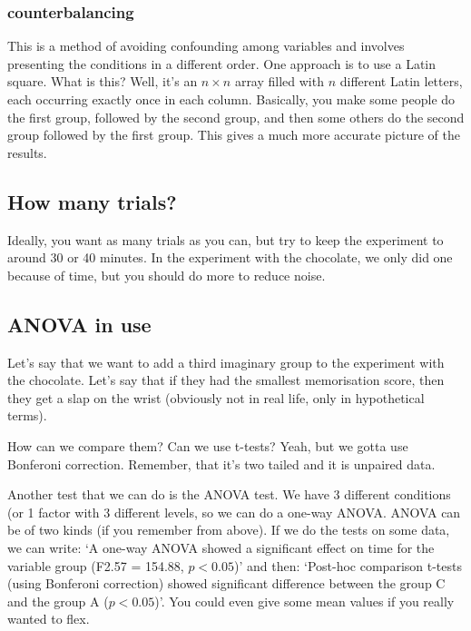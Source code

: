 \documentclass[11pt,a4paper,titlepage]{scrartcl}
\begin{document}
\subsubsection{counterbalancing}%
\label{ssub:counterbalancing}
This is a method of avoiding confounding among variables and involves
presenting the conditions in a different order. One approach is to use a
Latin square. What is this? Well, it's an $n \times n$ array filled with
$n$ different Latin letters, each occurring exactly once in each column.
Basically, you make some people do the first group, followed by the second
group, and then some others do the second group followed by the first
group. This gives a much more accurate picture of the results.

\subsection{How many trials?}%
\label{sub:trials}
Ideally, you want as many trials as you can, but try to keep the
experiment to around 30 or 40 minutes. In the experiment with the
chocolate, we only did one because of time, but you should do more to
reduce noise. 

\subsection{ANOVA in use}%
\label{sec:anova-usage}

Let's say that we want to add a third imaginary group to the experiment
with the chocolate. Let's say that if they had the smallest memorisation
score, then they get a slap on the wrist (obviously not in real life, only
in hypothetical terms). 

How can we compare them? Can we use t-tests? Yeah, but we gotta use
Bonferoni correction. Remember, that it's two tailed and it is unpaired
data.

Another test that we can do is the ANOVA test. We have 3 different
conditions (or 1 factor with 3 different levels, so we can do a one-way
ANOVA. ANOVA can be of two kinds (if you remember from above). If we do
the tests on some data, we can write: `A one-way ANOVA showed a
significant effect on time for the variable group (F2.57 = 154.88, $p <
0.05$)' and then: `Post-hoc comparison t-tests (using Bonferoni correction)
showed significant difference between the group C and the group A
($p<0.05$)'. You could even give some mean values if you really wanted to
flex.
\end{document}
